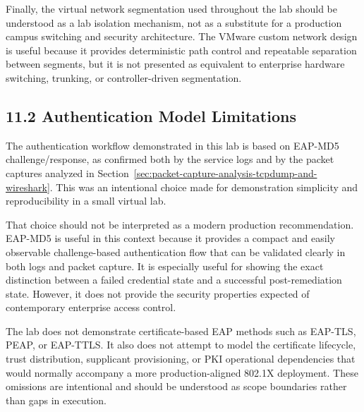 \documentclass[11pt]{article}
\begin{document}
Finally, the virtual network segmentation used throughout the lab should be understood as a lab isolation mechanism, not as a substitute for a production campus switching and security architecture. The VMware custom network design is useful because it provides deterministic path control and repeatable separation between segments, but it is not presented as equivalent to enterprise hardware switching, trunking, or controller-driven segmentation.


\subsection{11.2 Authentication Model Limitations}
\label{sec:authentication-model-limitations}

The authentication workflow demonstrated in this lab is based on EAP-MD5 challenge/response, as confirmed both by the service logs and by the packet captures analyzed in Section~\ref{sec:packet-capture-analysis-tcpdump-and-wireshark}. This was an intentional choice made for demonstration simplicity and reproducibility in a small virtual lab.

That choice should not be interpreted as a modern production recommendation. EAP-MD5 is useful in this context because it provides a compact and easily observable challenge-based authentication flow that can be validated clearly in both logs and packet capture. It is especially useful for showing the exact distinction between a failed credential state and a successful post-remediation state. However, it does not provide the security properties expected of contemporary enterprise access control.

The lab does not demonstrate certificate-based EAP methods such as EAP-TLS, PEAP, or EAP-TTLS. It also does not attempt to model the certificate lifecycle, trust distribution, supplicant provisioning, or PKI operational dependencies that would normally accompany a more production-aligned 802.1X deployment. These omissions are intentional and should be understood as scope boundaries rather than gaps in execution.
\end{document}
